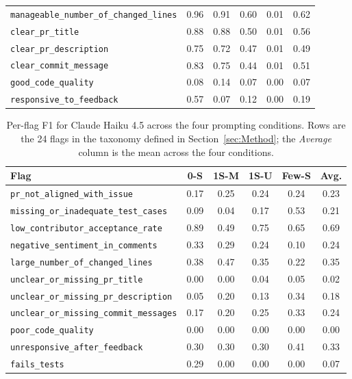 \begin{table}[!htbp]
\begin{tabular}{lccccc}
\texttt{manageable\_number\_of\_changed\_lines} & 0.96 & 0.91 & 0.60 & 0.01 & 0.62 \\
\texttt{clear\_pr\_title} & 0.88 & 0.88 & 0.50 & 0.01 & 0.56 \\
\texttt{clear\_pr\_description} & 0.75 & 0.72 & 0.47 & 0.01 & 0.49 \\
\texttt{clear\_commit\_message} & 0.83 & 0.75 & 0.44 & 0.01 & 0.51 \\
\texttt{good\_code\_quality} & 0.08 & 0.14 & 0.07 & 0.00 & 0.07 \\
\texttt{responsive\_to\_feedback} & 0.57 & 0.07 & 0.12 & 0.00 & 0.19 \\
\bottomrule
\end{tabular}
\end{table}


\begin{table}[!htbp]
\centering
\caption{Per-flag F1 for Claude Haiku 4.5 across the four prompting
conditions. Rows are the 24 flags in the taxonomy defined in
Section~\ref{sec:Method}; the \emph{Average} column is the mean across
the four conditions.}
\label{tab:perflag-claude-haiku-4-5}
\small
\begin{tabular}{lccccc}
\toprule
Flag & 0-S & 1S-M & 1S-U & Few-S & Avg. \\
\midrule
\texttt{pr\_not\_aligned\_with\_issue} & 0.17 & 0.25 & 0.24 & 0.24 & 0.23 \\
\texttt{missing\_or\_inadequate\_test\_cases} & 0.09 & 0.04 & 0.17 & 0.53 & 0.21 \\
\texttt{low\_contributor\_acceptance\_rate} & 0.89 & 0.49 & 0.75 & 0.65 & 0.69 \\
\texttt{negative\_sentiment\_in\_comments} & 0.33 & 0.29 & 0.24 & 0.10 & 0.24 \\
\texttt{large\_number\_of\_changed\_lines} & 0.38 & 0.47 & 0.35 & 0.22 & 0.35 \\
\texttt{unclear\_or\_missing\_pr\_title} & 0.00 & 0.00 & 0.04 & 0.05 & 0.02 \\
\texttt{unclear\_or\_missing\_pr\_description} & 0.05 & 0.20 & 0.13 & 0.34 & 0.18 \\
\texttt{unclear\_or\_missing\_commit\_messages} & 0.17 & 0.20 & 0.25 & 0.33 & 0.24 \\
\texttt{poor\_code\_quality} & 0.00 & 0.00 & 0.00 & 0.00 & 0.00 \\
\texttt{unresponsive\_after\_feedback} & 0.30 & 0.30 & 0.30 & 0.41 & 0.33 \\
\texttt{fails\_tests} & 0.29 & 0.00 & 0.00 & 0.00 & 0.07 \\

\end{tabular}
\end{table}

